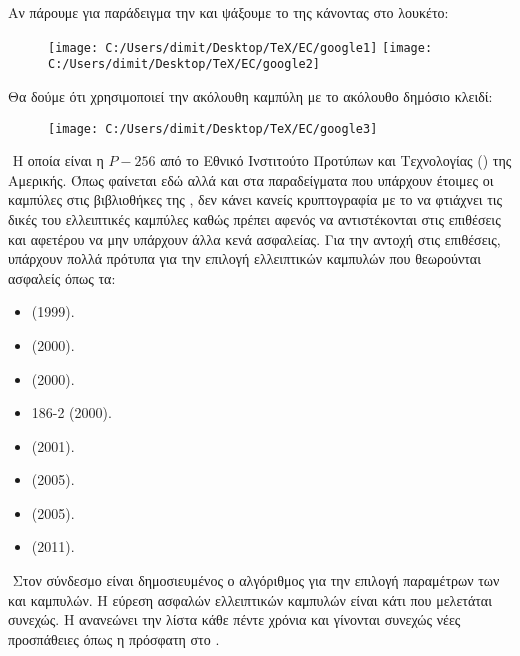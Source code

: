 \documentclass[oneside,a4paper]{article}
\begin{document}
\vspace*{0.3cm}
Αν πάρουμε για παράδειγμα την  και ψάξουμε το  της κάνοντας  στο λουκέτο:
\begin{figure}[H]
	\centering
	\texttt{[image: C:/Users/dimit/Desktop/TeX/EC/google1]}
	\texttt{[image: C:/Users/dimit/Desktop/TeX/EC/google2]}
\end{figure}
Θα δούμε ότι χρησιμοποιεί την ακόλουθη καμπύλη με το ακόλουθο δημόσιο κλειδί:
\begin{figure}[H]
	\centering
	\texttt{[image: C:/Users/dimit/Desktop/TeX/EC/google3]}
\end{figure}

$ $\newline
Η οποία είναι η $P-256$ από το Εθνικό Ινστιτούτο Προτύπων και Τεχνολογίας () της Αμερικής. Όπως φαίνεται εδώ αλλά και στα παραδείγματα που υπάρχουν έτοιμες οι καμπύλες στις βιβλιοθήκες της , δεν κάνει κανείς κρυπτογραφία με το να φτιάχνει τις δικές του ελλειπτικές καμπύλες καθώς πρέπει αφενός να αντιστέκονται στις επιθέσεις και αφετέρου να μην υπάρχουν άλλα κενά ασφαλείας. Για την αντοχή στις επιθέσεις, υπάρχουν πολλά πρότυπα για την επιλογή ελλειπτικών καμπυλών που θεωρούνται ασφαλείς όπως τα:
\begin{itemize}
	\item {} (1999).
	\item {} (2000).
	\item {} (2000).
	\item {} 186-2 (2000).
	\item {} (2001).
	\item {} (2005).
	\item {} (2005).
	\item {} (2011).
\end{itemize}

$ $\newline
Στον σύνδεσμο  είναι δημοσιευμένος ο αλγόριθμος για την επιλογή παραμέτρων των  και  καμπυλών. Η εύρεση ασφαλών ελλειπτικών καμπυλών είναι κάτι που μελετάται συνεχώς. Η  ανανεώνει την λίστα  κάθε πέντε χρόνια \cite{sec2} και γίνονται συνεχώς νέες προσπάθειες όπως η πρόσφατη στο \cite{lenstra}.
\end{document}
